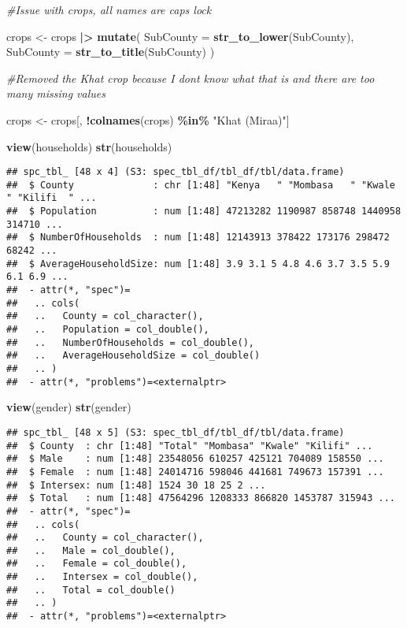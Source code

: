 \documentclass[
]{article}
\newenvironment{Shaded}{\begin{snugshade}}{\end{snugshade}}
\newcommand{\AttributeTok}[1]{\textcolor[rgb]{0.13,0.29,0.53}{#1}}
\newcommand{\CommentTok}[1]{\textcolor[rgb]{0.56,0.35,0.01}{\textit{#1}}}
\newcommand{\FunctionTok}[1]{\textcolor[rgb]{0.13,0.29,0.53}{\textbf{#1}}}
\newcommand{\NormalTok}[1]{#1}
\newcommand{\OtherTok}[1]{\textcolor[rgb]{0.56,0.35,0.01}{#1}}
\newcommand{\SpecialCharTok}[1]{\textcolor[rgb]{0.81,0.36,0.00}{\textbf{#1}}}
\newcommand{\StringTok}[1]{\textcolor[rgb]{0.31,0.60,0.02}{#1}}
\begin{document}
\begin{Shaded}
\begin{Highlighting}[]
\CommentTok{\#Issue with crops, all names are caps lock}

\NormalTok{crops }\OtherTok{\textless{}{-}}\NormalTok{ crops }\SpecialCharTok{|\textgreater{}} 
  \FunctionTok{mutate}\NormalTok{(}
    \AttributeTok{SubCounty =} \FunctionTok{str\_to\_lower}\NormalTok{(SubCounty),}
    \AttributeTok{SubCounty =} \FunctionTok{str\_to\_title}\NormalTok{(SubCounty)}
\NormalTok{  )}

\CommentTok{\#Removed the Khat crop because I don\textquotesingle{}t know what that is and there are too many missing values}

\NormalTok{crops }\OtherTok{\textless{}{-}}\NormalTok{ crops[, }\SpecialCharTok{!}\FunctionTok{colnames}\NormalTok{(crops) }\SpecialCharTok{\%in\%} \StringTok{"Khat (Miraa)"}\NormalTok{]}


\FunctionTok{view}\NormalTok{(households)}
\FunctionTok{str}\NormalTok{(households)}
\end{Highlighting}
\end{Shaded}

\begin{verbatim}
## spc_tbl_ [48 x 4] (S3: spec_tbl_df/tbl_df/tbl/data.frame)
##  $ County              : chr [1:48] "Kenya   " "Mombasa   " "Kwale  " "Kilifi  " ...
##  $ Population          : num [1:48] 47213282 1190987 858748 1440958 314710 ...
##  $ NumberOfHouseholds  : num [1:48] 12143913 378422 173176 298472 68242 ...
##  $ AverageHouseholdSize: num [1:48] 3.9 3.1 5 4.8 4.6 3.7 3.5 5.9 6.1 6.9 ...
##  - attr(*, "spec")=
##   .. cols(
##   ..   County = col_character(),
##   ..   Population = col_double(),
##   ..   NumberOfHouseholds = col_double(),
##   ..   AverageHouseholdSize = col_double()
##   .. )
##  - attr(*, "problems")=<externalptr>
\end{verbatim}

\begin{Shaded}
\begin{Highlighting}[]
\FunctionTok{view}\NormalTok{(gender)}
\FunctionTok{str}\NormalTok{(gender)}
\end{Highlighting}
\end{Shaded}

\begin{verbatim}
## spc_tbl_ [48 x 5] (S3: spec_tbl_df/tbl_df/tbl/data.frame)
##  $ County  : chr [1:48] "Total" "Mombasa" "Kwale" "Kilifi" ...
##  $ Male    : num [1:48] 23548056 610257 425121 704089 158550 ...
##  $ Female  : num [1:48] 24014716 598046 441681 749673 157391 ...
##  $ Intersex: num [1:48] 1524 30 18 25 2 ...
##  $ Total   : num [1:48] 47564296 1208333 866820 1453787 315943 ...
##  - attr(*, "spec")=
##   .. cols(
##   ..   County = col_character(),
##   ..   Male = col_double(),
##   ..   Female = col_double(),
##   ..   Intersex = col_double(),
##   ..   Total = col_double()
##   .. )
##  - attr(*, "problems")=<externalptr>
\end{verbatim}
\end{document}
